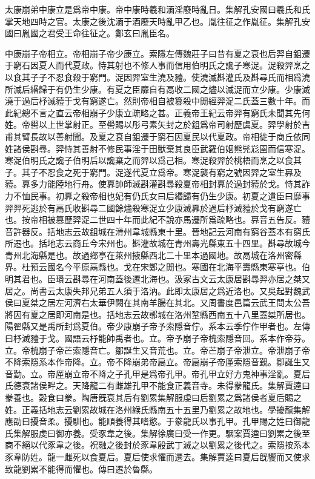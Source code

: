 太康崩弟中康立是爲帝中康。帝中康時羲和湎淫廢時亂日。集解孔安國曰羲氏和氏掌天地四時之官。太康之後沈湎于酒廢天時亂甲乙也。胤往征之作胤征。集解孔安國曰胤國之君受王命往征之。鄭玄曰胤臣名。

中康崩子帝相立。帝相崩子帝少康立。索隱左傳魏莊子曰昔有夏之衰也后羿自鉏遷于窮石因夏人而代夏政。恃其射也不修人事而信用伯明氏之讒子寒浞。浞殺羿烹之以食其子子不忍食殺于窮門。浞因羿室生澆及豷。使澆滅斟灌氏及斟尋氏而相爲澆所滅后緡歸于有仍生少康。有夏之臣靡自有鬲收二國之燼以滅浞而立少康。少康滅澆于過后杼滅豷于戈有窮遂亡。然則帝相自被篡殺中閒經羿浞二氏蓋三數十年。而此紀總不言之直云帝相崩子少康立疏略之甚。正義帝王紀云帝羿有窮氏未聞其先何姓。帝嚳以上世掌射正。至嚳賜以彤弓素矢封之於鉏爲帝司射歷虞夏。羿學射於吉甫其臂長故以善射聞。及夏之衰自鉏遷于窮石因夏民以代夏政。帝相徙于商丘依同姓諸侯斟尋。羿恃其善射不修民事淫于田獸棄其良臣武羅伯姻熊髡尨圉而信寒浞。寒浞伯明氏之讒子伯明后以讒棄之而羿以爲己相。寒浞殺羿於桃梧而烹之以食其子。其子不忍食之死于窮門。浞遂代夏立爲帝。寒浞襲有窮之號因羿之室生奡及豷。奡多力能陸地行舟。使奡帥師滅斟灌斟尋殺夏帝相封奡於過封豷於戈。恃其詐力不恤民事。初奡之殺帝相也妃有仍氏女曰后緡歸有仍生少康。初夏之遺臣曰靡事羿羿死逃於有鬲氏收斟尋二國餘燼殺寒浞立少康滅奡於過后杼滅豷於戈有窮遂亡也。按帝相被篡歷羿浞二世四十年而此紀不說亦馬遷所爲疏略也。奡音五告反。豷音許器反。括地志云故鉏城在滑州韋城縣東十里。晉地記云河南有窮谷蓋本有窮氏所遷也。括地志云商丘今宋州也。斟灌故城在青州壽光縣東五十四里。斟尋故城今青州北海縣是也。故過鄉亭在萊州掖縣西北二十里本過國地。故鬲城在洛州密縣界。杜預云國名今平原鬲縣也。戈在宋鄭之閒也。寒國在北海平壽縣東寒亭也。伯明其君也。臣瓚云斟尋在河南蓋後遷北海也。汲冢古文云太康居斟尋羿亦居之桀又居之。尚書云太康失邦兄弟五人須于洛汭。此即太康居之爲近洛也。又吳起對魏武侯曰夏桀之居左河濟右太華伊闕在其南羊腸在其北。又周書度邑篇云武王問太公吾將因有夏之居即河南是也。括地志云故鄩城在洛州鞏縣西南五十八里蓋桀所居也。陽翟縣又是禹所封爲夏伯。帝少康崩子帝予索隱音佇。系本云季佇作甲者也。左傳曰杼滅豷于戈。國語云杼能帥禹者也。立。帝予崩子帝槐索隱音回。系本作帝芬。立。帝槐崩子帝芒索隱音亡。鄒誕生又音荒也。立。帝芒崩子帝泄立。帝泄崩子帝不降索隱系本作帝降。立。帝不降崩弟帝扃立。帝扃崩子帝厪索隱音覲。鄒誕生又音勤。立。帝厪崩立帝不降之子孔甲是爲帝孔甲。帝孔甲立好方鬼神事淫亂。夏后氏德衰諸侯畔之。天降龍二有雌雄孔甲不能食正義音寺。未得豢龍氏。集解賈逵曰豢養也。穀食曰豢。陶唐旣衰其后有劉累集解服虔曰后劉累之爲諸侯者夏后賜之姓。正義括地志云劉累故城在洛州緱氏縣南五十五里乃劉累之故地也。學擾龍集解應劭曰擾音柔。擾馴也。能順養得其嗜慾。于豢龍氏以事孔甲。孔甲賜之姓曰御龍氏集解服虔曰御亦養。受豕韋之後。集解徐廣曰受一作更。駰案賈逵曰劉累之後至商不絕以代豕韋之後。祝融之後封於豕韋殷武丁滅之以劉累之後代之。索隱按系本豕韋防姓。龍一雌死以食夏后。夏后使求懼而遷去。集解賈逵曰夏后旣饗而又使求致龍劉累不能得而懼也。傳曰遷於魯縣。

